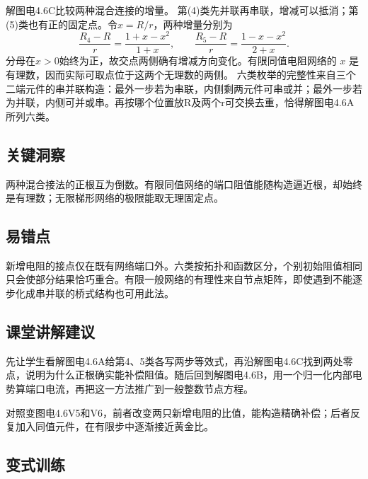 \documentclass[UTF8,fontset=fandol,a4paper,11pt]{ctexart}
\begin{document}
解图电4.6C比较两种混合连接的增量。
第(4)类先并联再串联，增减可以抵消；第(5)类也有正的固定点。令$x=R/r$，两种增量分别为
\[
\frac{R_4-R}{r}=\frac{1+x-x^2}{1+x},\qquad
\frac{R_5-R}{r}=\frac{1-x-x^2}{2+x}.
\]
分母在$x>0$始终为正，故交点两侧确有增减方向变化。有限同值电阻网络的 $x$ 是有理数，因而实际可取点位于这两个无理数的两侧。
六类枚举的完整性来自三个二端元件的串并联构造：最外一步若为串联，内侧剩两元件可串或并；最外一步若为并联，内侧可并或串。再按哪个位置放R及两个r可交换去重，恰得解图电4.6A所列六类。




\subsection*{关键洞察}

两种混合接法的正根互为倒数。有限同值网络的端口阻值能随构造逼近根，却始终是有理数；无限梯形网络的极限能取无理固定点。



\subsection*{易错点}

新增电阻的接点仅在既有网络端口外。六类按拓扑和函数区分，个别初始阻值相同只会使部分结果恰巧重合。有限一般网络的有理性来自节点矩阵，即使遇到不能逐步化成串并联的桥式结构也可用此法。



\subsection*{课堂讲解建议}

先让学生看解图电4.6A给第4、5类各写两步等效式，再沿解图电4.6C找到两处零点，说明为什么正根确实能补偿阻值。随后回到解图电4.6B，用一个归一化内部电势算端口电流，再把这一方法推广到一般整数节点方程。

对照变图电4.6V5和V6，前者改变两只新增电阻的比值，能构造精确补偿；后者反复加入同值元件，在有限步中逐渐接近黄金比。


\subsection*{变式训练}
\end{document}
